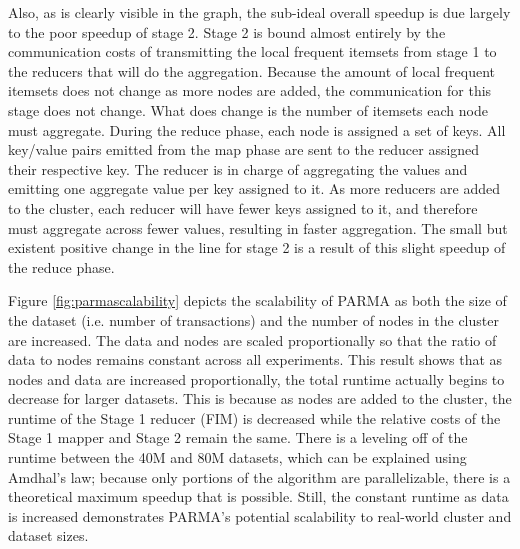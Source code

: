 Also, as is clearly visible in the graph, the sub-ideal overall
speedup is due largely to the poor speedup of stage 2. Stage 2 is
bound almost entirely by the communication costs of transmitting the
local frequent itemsets from stage 1 to the reducers that will do the
aggregation. Because the amount of local frequent itemsets does not
change as more nodes are added, the communication for this stage does
not change. What does change is the number of itemsets each node must
aggregate. During the reduce phase, each node is assigned a set of
keys. All key/value pairs emitted from the map phase are sent to the
reducer assigned their respective key. The reducer is in charge of
aggregating the values and emitting one aggregate value per key assigned
to it. As more reducers are added to the cluster, each reducer will
have fewer keys assigned to it, and therefore must aggregate across
fewer values, resulting in faster aggregation. The small but existent positive
change in the line for stage 2 is a result of this slight speedup of the reduce
phase. 

Figure \ref{fig:parmascalability} depicts the scalability of PARMA as both
the size of the dataset (i.e. number of transactions) and the number of
nodes in the cluster are increased. The data and nodes are scaled
proportionally so that the ratio of data to nodes remains constant
across all experiments. This result shows that as nodes and data are
increased proportionally, the total runtime actually begins to decrease
for larger datasets. This is because as nodes are added to the cluster, the runtime of
the Stage 1 reducer (FIM) is decreased while the relative costs of
the Stage 1 mapper and Stage 2 remain the same. There is a leveling
off of the runtime between the 40M and 80M datasets, which can be
explained using Amdhal's law; because only portions of the algorithm
are parallelizable, there is a theoretical maximum speedup that is
possible. Still, the constant runtime as data is increased
demonstrates PARMA's potential scalability to real-world cluster and
dataset sizes. 

